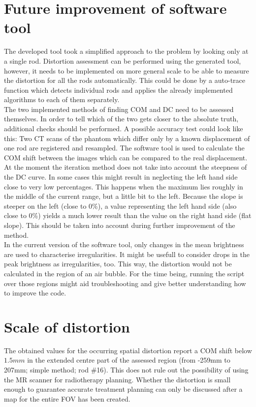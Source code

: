     
\section{Future improvement of software tool}

The developed tool took a simplified approach to the problem by looking only at a single rod.
Distortion assessment can be performed using the generated tool, however, it needs to be implemented on more general scale to be able to measure the distortion for all the rods automatically.
This could be done by a auto-trace function which detects individual rods and applies the already implemented algorithms to each of them separately.\\

The two implemented methods of finding COM and DC need to be assessed themselves.
In order to tell which of the two gets closer to the absolute truth, additional checks should be performed.
A possible accuracy test could look like this:
Two CT scans of the phantom which differ only by a known displacement of one rod are registered and resampled.
The software tool is used to calculate the COM shift between the images which can be compared to the real displacement.\\

At the moment the iteration method does not take into account the steepness of the DC curve.
In some cases this might result in neglecting the left hand side close to very low percentages.
This happens when the maximum lies roughly in the middle of the current range, but a little bit to the left.
Because the slope is steeper on the left (close to 0\%), a value representing the left hand side (also close to 0\%) yields a much lower result than the value on the right hand side (flat slope).
This should be taken into account during further improvement of the method.\\

In the current version of the software tool, only changes in the mean brightness are used to characterise irregularities.
It might be usefull to consider drops in the peak brightness as irregularities, too.
This way, the distortion would not be calculated in the region of an air bubble.
For the time being, running the script over those regions might aid troubleshooting and give better understanding how to improve the code.\\


\section{Scale of distortion}

The obtained values for the occurring spatial distortion report a COM shift below $1.5mm$ in the extended centre part of the assessed region (from -259mm to 207mm; simple method; rod \#16).
This does not rule out the possibility of using the MR scanner for radiotherapy planning.
Whether the distortion is small enough to guarantee accurate treatment planning can only be discussed after a map for the entire FOV has been created.



